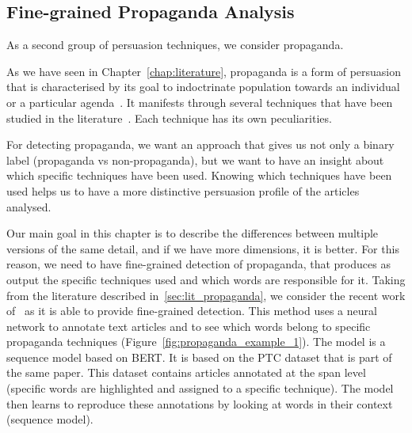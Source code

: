 





\subsection{\statusorange Fine-grained Propaganda Analysis}
\label{ssec:lp_techniques_propaganda}

As a second group of persuasion techniques, we consider \gls{propaganda}.

As we have seen in Chapter~\ref{chap:literature}, propaganda is a form of persuasion that is characterised by its goal to indoctrinate population towards an individual or a particular agenda~\citep{bernays}.
It manifests through several techniques that have been studied in the literature~\citep{torok2015symbiotic}. Each technique has its own peculiarities.

For detecting propaganda, we want an approach that gives us not only a binary label (propaganda vs non-propaganda), but we want to have an insight about which specific techniques have been used.
Knowing which techniques have been used helps us to have a more distinctive persuasion profile of the articles analysed.

Our main goal in this chapter is to describe the differences between multiple versions of the same detail, and if we have more dimensions, it is better.
For this reason, we need to have fine-grained detection of propaganda, that produces as output the specific techniques used and which words are responsible for it.
Taking from the literature described in~\ref{sec:lit_propaganda}, we consider the recent work of~\cite{da2019fine} as it is able to provide fine-grained detection. This method uses a neural network to annotate text articles and to see which words belong to specific propaganda techniques (Figure~\ref{fig:propaganda_example_1}).
The model is a sequence model based on BERT. It is based on the PTC dataset that is part of the same paper. This dataset contains articles annotated at the span level (specific words are highlighted and assigned to a specific technique). The model then learns to reproduce these annotations by looking at words in their context (sequence model).

